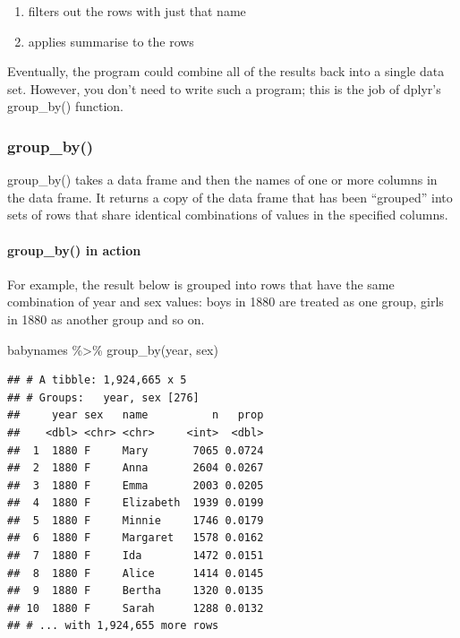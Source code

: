 \documentclass[
]{article}
\newenvironment{Shaded}{\begin{snugshade}}{\end{snugshade}}
\newcommand{\FunctionTok}[1]{\textcolor[rgb]{0.00,0.00,0.00}{#1}}
\newcommand{\NormalTok}[1]{#1}
\newcommand{\SpecialCharTok}[1]{\textcolor[rgb]{0.00,0.00,0.00}{#1}}
\providecommand{\tightlist}{%
  \setlength{\itemsep}{0pt}\setlength{\parskip}{0pt}}
\begin{document}
\begin{enumerate}
\def\labelenumi{\arabic{enumi}.}
\tightlist
\item
  filters out the rows with just that name
\item
  applies summarise to the rows
\end{enumerate}

Eventually, the program could combine all of the results back into a
single data set. However, you don't need to write such a program; this
is the job of dplyr's group\_by() function.

\hypertarget{group_by}{%
\subsubsection{group\_by()}\label{group_by}}

group\_by() takes a data frame and then the names of one or more columns
in the data frame. It returns a copy of the data frame that has been
``grouped'' into sets of rows that share identical combinations of
values in the specified columns.

\hypertarget{group_by-in-action}{%
\paragraph{group\_by() in action}\label{group_by-in-action}}

For example, the result below is grouped into rows that have the same
combination of year and sex values: boys in 1880 are treated as one
group, girls in 1880 as another group and so on.

\begin{Shaded}
\begin{Highlighting}[]
\NormalTok{babynames }\SpecialCharTok{\%\textgreater{}\%}
  \FunctionTok{group\_by}\NormalTok{(year, sex)}
\end{Highlighting}
\end{Shaded}

\begin{verbatim}
## # A tibble: 1,924,665 x 5
## # Groups:   year, sex [276]
##     year sex   name          n   prop
##    <dbl> <chr> <chr>     <int>  <dbl>
##  1  1880 F     Mary       7065 0.0724
##  2  1880 F     Anna       2604 0.0267
##  3  1880 F     Emma       2003 0.0205
##  4  1880 F     Elizabeth  1939 0.0199
##  5  1880 F     Minnie     1746 0.0179
##  6  1880 F     Margaret   1578 0.0162
##  7  1880 F     Ida        1472 0.0151
##  8  1880 F     Alice      1414 0.0145
##  9  1880 F     Bertha     1320 0.0135
## 10  1880 F     Sarah      1288 0.0132
## # ... with 1,924,655 more rows
\end{verbatim}
\end{document}
